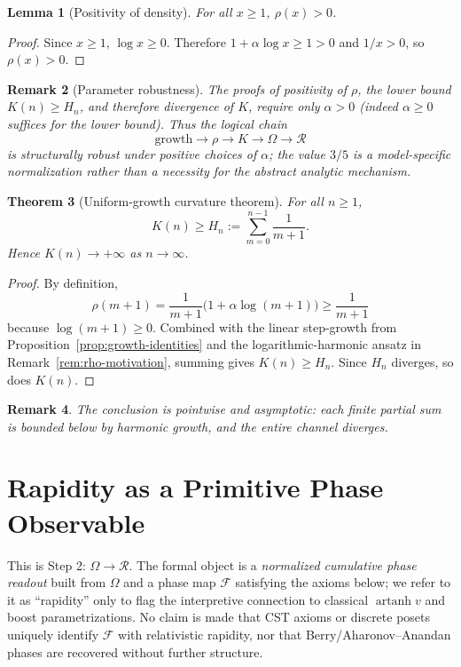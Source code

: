 \documentclass[11pt]{amsart}
\newtheorem{theorem}{Theorem}[section]
\newtheorem{lemma}[theorem]{Lemma}
\newtheorem{remark}[theorem]{Remark}
\begin{document}
\begin{lemma}[Positivity of density]
For all $x\ge 1$, $\rho(x)>0$.
\end{lemma}

\begin{proof}
Since $x\ge 1$, $\log x\ge 0$. Therefore $1+\alpha\log x\ge 1>0$ and $1/x>0$, so $\rho(x)>0$.
\end{proof}

\begin{remark}[Parameter robustness]
The proofs of positivity of \(\rho\), the lower bound \(K(n)\ge H_n\), and therefore divergence of \(K\), require only \(\alpha>0\) (indeed \(\alpha\ge 0\) suffices for the lower bound). Thus the logical chain
\[
\text{growth}\to \rho \to K \to \Omega \to \mathcal R
\]
is structurally robust under positive choices of \(\alpha\); the value \(3/5\) is a model-specific normalization rather than a necessity for the abstract analytic mechanism.
\end{remark}

\begin{theorem}[Uniform-growth curvature theorem]
\label{thm:main-curvature}
For all $n\ge 1$,
\[
K(n)\ge H_n:=\sum_{m=0}^{n-1}\frac1{m+1}.
\]
Hence $K(n)\to +\infty$ as $n\to\infty$.
\end{theorem}

\begin{proof}
By definition,
\[
\rho(m+1)=\frac1{m+1}\bigl(1+\alpha\log(m+1)\bigr)\ge \frac1{m+1}
\]
because $\log(m+1)\ge 0$. Combined with the linear step-growth from Proposition~\ref{prop:growth-identities} and the logarithmic-harmonic ansatz in Remark~\ref{rem:rho-motivation}, summing gives $K(n)\ge H_n$.
Since $H_n$ diverges, so does $K(n)$.
\end{proof}

\begin{remark}
The conclusion is pointwise and asymptotic: each finite partial sum is bounded below by harmonic growth, and the entire channel diverges.
\end{remark}

\section{Rapidity as a Primitive Phase Observable}
\label{sec:rapidity}
This is Step 2: \(\Omega\to\mathcal R\). The formal object is a \emph{normalized cumulative phase readout} built from \(\Omega\) and a phase map \(\mathcal F\) satisfying the axioms below; we refer to it as ``rapidity'' only to flag the interpretive connection to classical \(\operatorname{artanh}v\) and boost parametrizations. No claim is made that CST axioms or discrete posets uniquely identify \(\mathcal{F}\) with relativistic rapidity, nor that Berry/Aharonov--Anandan phases are recovered without further structure.
\end{document}
